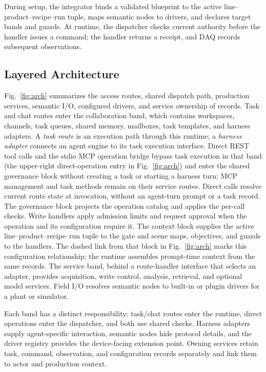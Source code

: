 During setup, the integrator binds a validated blueprint to the active
line--product--recipe--run tuple, maps semantic nodes to drivers, and declares
target bands and guards. At runtime, the dispatcher checks current authority
before the handler issues a command; the handler returns a receipt, and DAQ
records subsequent observations.

\subsection{Layered Architecture}
\label{sec:layers}
\label{sec:arch}
Fig.~\ref{fig:arch} summarizes the access routes, shared dispatch path,
production services, semantic I/O, configured drivers, and service ownership
of records. Task and chat routes enter the
collaboration band, which contains workspaces, channels, task queues, shared
memory, mailboxes, task templates, and harness adapters. A \emph{task route}
is an execution path through this runtime; a \emph{harness adapter} connects
an agent engine to its task execution interface. Direct REST tool
calls and the stdio MCP operation bridge bypass task execution in that band
(the upper-right direct-operation entry in
Fig.~\ref{fig:arch}) and enter the shared governance block without creating a
task or starting a harness turn; MCP management and task methods remain on
their service routes. Direct calls resolve current route state at invocation,
without an agent-turn prompt or a task record.
The governance block projects the operation catalog and applies the per-call
checks. Write handlers apply admission limits and request approval when the
operation and its configuration require it. The
context block supplies the active line--product--recipe--run tuple to the gate
and scene maps, objectives, and guards to the handlers. The dashed link from
that block in Fig.~\ref{fig:arch} marks this configuration relationship; the
runtime assembles prompt-time context from the same records. The service band,
behind a route-handler interface that selects an adapter, provides
acquisition, write control, analysis, retrieval, and optional model services.
Field I/O resolves semantic nodes to built-in or plugin drivers for a plant or
simulator.

Each band has a distinct responsibility: task/chat routes enter the runtime,
direct operations enter the dispatcher, and both use shared checks. Harness
adapters supply agent-specific interaction, semantic nodes hide protocol
details, and the driver registry provides the device-facing extension point.
Owning services retain task, command, observation, and configuration records
separately and link them to actor and production context.

